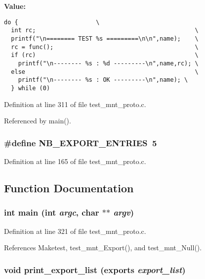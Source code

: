 {\bf Value:}

\footnotesize\begin{verbatim}do {                      \
  int rc;                                             \
  printf("\n======== TEST %s =========\n\n",name);    \
  rc = func();                                        \
  if (rc)                                             \
    printf("\n-------- %s : %d ---------\n",name,rc); \
  else                                                \
    printf("\n-------- %s : OK ---------\n",name); \
  } while (0)
\end{verbatim}\normalsize 


Definition at line 311 of file test\_\-mnt\_\-proto.c.

Referenced by main().
\subsubsection{\setlength{\rightskip}{0pt plus 5cm}\#define NB\_\-EXPORT\_\-ENTRIES\ 5}\label{test__mnt__proto_8c_a0}




Definition at line 165 of file test\_\-mnt\_\-proto.c.

\subsection{Function Documentation}
\subsubsection{\setlength{\rightskip}{0pt plus 5cm}int main (int {\em argc}, char $\ast$$\ast$ {\em argv})}\label{test__mnt__proto_8c_a5}




Definition at line 321 of file test\_\-mnt\_\-proto.c.

References Maketest, test\_\-mnt\_\-Export(), and test\_\-mnt\_\-Null().
\subsubsection{\setlength{\rightskip}{0pt plus 5cm}void print\_\-export\_\-list (exports {\em export\_\-list})}\label{test__mnt__proto_8c_a2}





